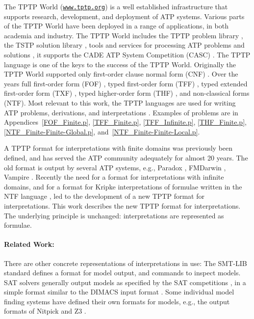 \documentclass{easychair}
\begin{document}
The TPTP World \cite{Sut17} (\href{https://www.tptp.org}{\tt www.tptp.org}) is a well established 
infrastructure that supports research, development, and deployment of 
ATP systems.
Various parts of the TPTP World have been deployed in a range of applications, in both academia 
and industry.
The TPTP World includes the TPTP problem library \cite{Sut09}, 
the TSTP solution library \cite{Sut10}, 
tools and services for processing ATP problems and solutions \cite{Sut10}, 
it supports the CADE ATP System Competition (CASC) \cite{Sut16}.
The TPTP language \cite{Sut23-IGPL} is one of the keys to the success of the TPTP World.
Originally the TPTP World supported only first-order clause normal form (CNF)
\cite{SS98-JAR}.
Over the years full first-order form (FOF)
\cite{Sut09}, 
typed first-order form (TFF)
\cite{SS+12,BP13-TFF1}, 
typed extended first-order form (TXF)
\cite{SK18}, 
typed higher-order form (THF)
\cite{SB10,KSR16}, 
and non-classical forms (NTF).
Most relevant to this work, the TPTP languages are used for writing ATP problems, 
derivations, and interpretations \cite{SS+06,Sut08-KEAPPA}.
Examples of problems are in Appendices~\ref{FOF_Finite.p}, \ref{TFF_Finite.p},
\ref{TFF_Infinite.p}, \ref{THF_Finite.p}, \ref{NTF_Finite-Finite-Global.p}, 
and~\ref{NTF_Finite-Finite-Local.p}.

A TPTP format for interpretations with finite domains \cite{SS+06} was previously been defined, 
and has served the ATP community adequately for almost 20 years. 
The old format is output by several ATP systems, e.g., Paradox \cite{CS03}, FMDarwin \cite{BF+06}, 
Vampire \cite{KV13}.
Recently the need for a format for interpretations with infinite domains, and for a format for 
Kripke interpretations \cite{Kri63} of formulae written in the NTF language \cite{SF+22}, 
led to the development of a new TPTP format for interpretations.
This work describes the new TPTP format for interpretations.
The underlying principle is unchanged: interpretations are represented as formulae.

\paragraph{Related Work:}
There are other concrete representations of interpretations in use:
The SMT-LIB standard \cite{BFT17} defines a format for model output, and commands to inspect 
models.  
SAT solvers generally output models as specified by the SAT competitions \cite{JL+12}, in a 
simple format similar to the DIMACS input format \cite{Bab93}.
Some individual model finding systems have defined their own formats for models, e.g., the 
output formats of Nitpick and Z3 \cite{dMB08}.
\end{document}
